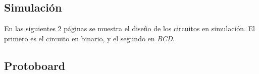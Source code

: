 \documentclass[12pt, oneside]{article}
\begin{document}
\subsection{Simulación}
{\sffamily\large
    \hspace{0.5cm} En las siguientes 2 páginas se muestra el diseño de los circuitos en simulación.
    El primero es el circuito en binario, y el segundo en \emph{BCD}.

    \newpage
    

    \newpage
    

}

\newpage
\subsection{Protoboard}
\end{document}
